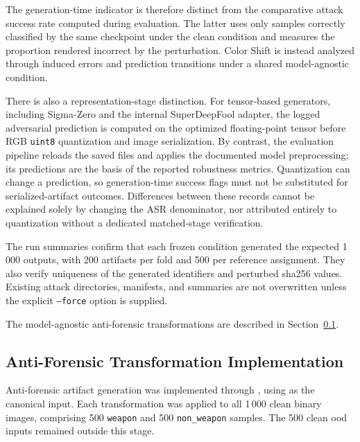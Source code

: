 The generation-time indicator is therefore distinct from the comparative
attack success rate computed during evaluation. The latter uses only samples
correctly classified by the same checkpoint under the clean condition and
measures the proportion rendered incorrect by the perturbation. Color Shift is
instead analyzed through induced errors and prediction transitions under a
shared model-agnostic condition.

There is also a representation-stage distinction. For tensor-based generators,
including Sigma-Zero and the internal SuperDeepFool adapter, the logged
adversarial prediction is computed on the optimized floating-point tensor
before RGB \texttt{uint8} quantization and image serialization. By contrast,
the evaluation pipeline reloads the saved files and applies the documented
model preprocessing; its predictions are the basis of the reported robustness
metrics. Quantization can change a prediction, so generation-time success
flags must not be substituted for serialized-artifact outcomes. Differences
between these records cannot be explained solely by changing the ASR
denominator, nor attributed entirely to quantization without a dedicated
matched-stage verification.

The run summaries confirm that each frozen condition generated the expected
1\,000 outputs, with 200 artifacts per fold and 500 per reference assignment.
They also verify uniqueness of the generated identifiers and perturbed
\gls{sha256} values. Existing attack directories, manifests, and summaries are
not overwritten unless the explicit \texttt{--force} option is supplied.

The model-agnostic anti-forensic transformations are described in
Section~\ref{subsec:implementation-antiforensic}.

\subsection{Anti-Forensic Transformation Implementation}
\label{subsec:implementation-antiforensic}

Anti-forensic artifact generation was implemented through
, using
 as the canonical
input. Each transformation was applied to all 1\,000 clean binary images,
comprising 500 \texttt{weapon} and 500 \texttt{non\_weapon} samples. The 500
clean \gls{ood} inputs remained outside this stage.

